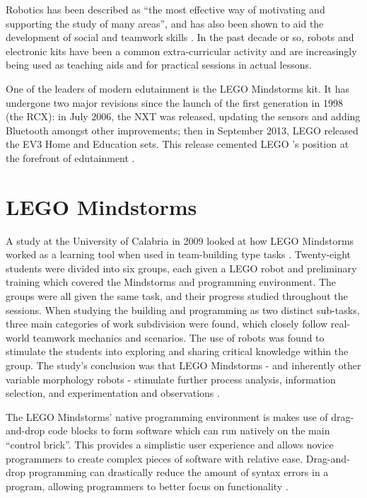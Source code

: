\documentclass{report}
\newcommand{\lego}{LEGO }
\begin{document}
    Robotics has been described as \enquote{the most effective way of motivating and supporting the study of many areas}, and has also been shown to aid the development of social and teamwork skills \cite{Johnson2003}. In the past decade or so, robots and electronic kits have been a common extra-curricular activity and are increasingly being used as teaching aids and for practical sessions in actual lessons.
    
	One of the leaders of modern edutainment is the \lego Mindstorms kit. It has undergone two major revisions since the launch of the first generation in 1998 (the RCX): in July 2006, the NXT was released, updating the sensors and adding Bluetooth amongst other improvements; then in September 2013, \lego released the EV3 Home and Education sets. This release cemented \lego's position at the forefront of edutainment \cite{Becker}.
    
    \section{\lego Mindstorms}
    A study at the University of Calabria in 2009 looked at how \lego Mindstorms worked as a learning tool when used in team-building type tasks \cite{Bilotta2009}. Twenty-eight students were divided into six groups, each given a \lego robot and preliminary training which covered the Mindstorms and programming environment. The groups were all given the same task, and their progress studied throughout the sessions. When studying the building and programming as two distinct sub-tasks, three main categories of work subdivision were found, which closely follow real-world teamwork mechanics and scenarios. The use of robots was found to stimulate the students into exploring and sharing critical knowledge within the group. The study's conclusion was that \lego Mindstorms - and inherently other variable morphology robots - stimulate further process analysis, information selection, and experimentation and observations \cite{Bilotta2009}.
    
    The \lego Mindstorms' native programming environment is makes use of drag-and-drop code blocks to form software which can run natively on the main \enquote{control brick}. This provides a simplistic user experience and allows novice programmers to create complex pieces of software with relative ease. Drag-and-drop programming can drastically reduce the amount of syntax errors in a program, allowing programmers to better focus on functionality \cite{Kelleher2002}.
\end{document}
